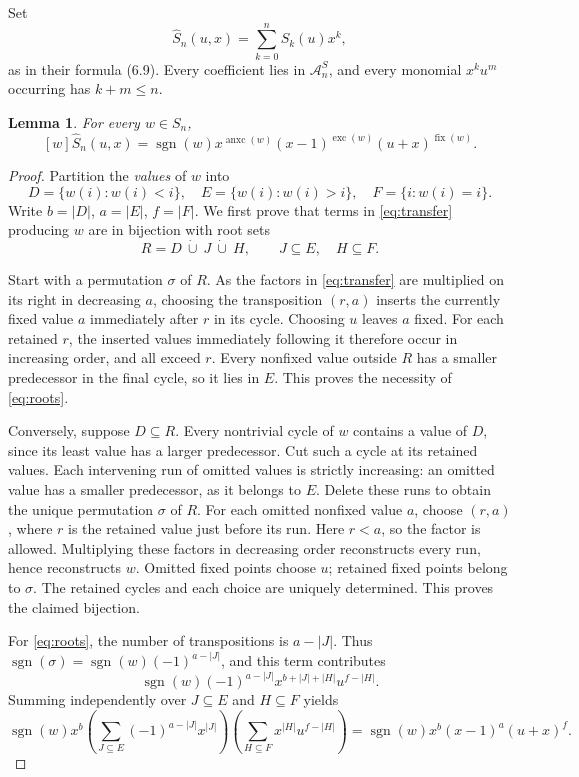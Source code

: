 \documentclass[11pt]{article}
\newtheorem{lemma}{Lemma}
\DeclareMathOperator{\exc}{exc}
\DeclareMathOperator{\anxc}{anxc}
\DeclareMathOperator{\fix}{fix}
\DeclareMathOperator{\sgn}{sgn}
\newcommand{\A}{\mathcal A_n^S}
\begin{document}
Set
\[
\widehat S_n(u,x)=\sum_{k=0}^nS_k(u)x^k,
\]
as in their formula (6.9). Every coefficient lies in \(\A\), and
every monomial \(x^ku^m\) occurring has \(k+m\leq n\).

\begin{lemma}\label{lem:coefficient}
For every \(w\in S_n\),
\begin{equation}\label{eq:coefficient}
[w]\widehat S_n(u,x)=
\sgn(w)x^{\anxc(w)}(x-1)^{\exc(w)}(u+x)^{\fix(w)}.
\end{equation}
\end{lemma}
\begin{proof}
Partition the \emph{values} of \(w\) into
\[
D=\{w(i):w(i)<i\},\quad E=\{w(i):w(i)>i\},\quad F=\{i:w(i)=i\}.
\]
Write \(b=|D|\), \(a=|E|\), \(f=|F|\).
We first prove that terms in \eqref{eq:transfer} producing \(w\) are in
bijection with root sets
\begin{equation}\label{eq:roots}
R=D\ \dot\cup\ J\ \dot\cup\ H,\qquad J\subseteq E,\quad H\subseteq F.
\end{equation}

Start with a permutation \(\sigma\) of \(R\). As the factors in
\eqref{eq:transfer} are multiplied on its right in decreasing \(a\),
choosing the transposition \((r,a)\) inserts the currently fixed value
\(a\) immediately after \(r\) in its cycle. Choosing \(u\) leaves \(a\)
fixed. For each retained \(r\), the inserted values immediately following
it therefore occur in increasing order, and all exceed \(r\).
Every nonfixed value outside \(R\) has a smaller predecessor in the final
cycle, so it lies in \(E\). This proves the necessity of \eqref{eq:roots}.

Conversely, suppose \(D\subseteq R\). Every nontrivial cycle of \(w\)
contains a value of \(D\), since its least value has a larger predecessor.
Cut such a cycle at its retained values. Each intervening run of omitted
values is strictly increasing: an omitted value has a smaller predecessor,
as it belongs to \(E\). Delete these runs to obtain the unique permutation
\(\sigma\) of \(R\). For each omitted nonfixed value \(a\), choose
\((r,a)\), where \(r\) is the retained value just before its run.
Here \(r<a\), so the factor is allowed. Multiplying these factors in
decreasing order reconstructs every run, hence reconstructs \(w\).
Omitted fixed points choose \(u\); retained fixed points belong to
\(\sigma\). The retained cycles and each choice are uniquely determined.
This proves the claimed bijection.

For \eqref{eq:roots}, the number of transpositions is \(a-|J|\).
Thus \(\sgn(\sigma)=\sgn(w)(-1)^{a-|J|}\), and this term contributes
\[
\sgn(w)(-1)^{a-|J|}
x^{b+|J|+|H|}u^{f-|H|}.
\]
Summing independently over \(J\subseteq E\) and \(H\subseteq F\) yields
\[
\sgn(w)x^b
\left(\sum_{J\subseteq E}(-1)^{a-|J|}x^{|J|}\right)
\left(\sum_{H\subseteq F}x^{|H|}u^{f-|H|}\right)
=\sgn(w)x^b(x-1)^a(u+x)^f.
\]
\end{proof}
\end{document}
